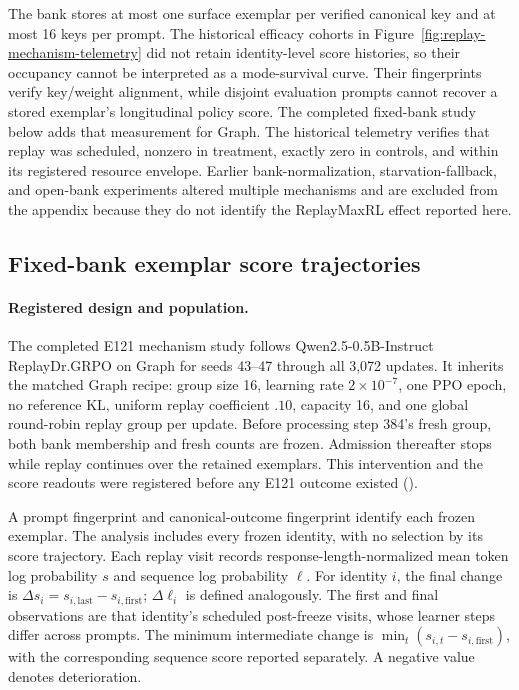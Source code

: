 \documentclass{article}
\newcommand{\1}{\mathbf 1}
\theoremstyle{remark}
\theoremstyle{definition}
\theoremstyle{plain}
\begin{document}
The bank stores at most one surface exemplar per verified canonical key and at
most 16 keys per prompt. The historical efficacy cohorts in
Figure~\ref{fig:replay-mechanism-telemetry} did not retain identity-level score
histories, so their occupancy cannot be interpreted as a mode-survival curve.
Their fingerprints verify key/weight alignment, while disjoint evaluation
prompts cannot recover a stored exemplar's longitudinal policy score.
The completed fixed-bank study below adds that measurement for Graph.
The historical telemetry verifies that replay was scheduled, nonzero in
treatment, exactly zero in controls, and within its registered resource envelope. Earlier
bank-normalization, starvation-fallback, and open-bank experiments altered
multiple mechanisms and are excluded from the appendix because they do not
identify the ReplayMaxRL effect reported here.

\subsection{Fixed-bank exemplar score trajectories}
\label{app:fixed-bank-survival}

\paragraph{Registered design and population.}
The completed E121 mechanism study follows Qwen2.5-0.5B-Instruct
ReplayDr.GRPO on Graph for seeds 43--47 through all 3,072 updates. It inherits
the matched Graph recipe: group size 16, learning rate $2\times10^{-7}$,
one PPO epoch, no reference KL, uniform replay coefficient $.10$, capacity
16, and one global round-robin replay group per update. Before processing
step 384's fresh group, both bank membership and fresh counts are frozen.
Admission thereafter stops while replay continues over the retained exemplars.
This intervention and the score readouts were registered before any E121
outcome existed
().

A prompt fingerprint and canonical-outcome fingerprint identify each frozen
exemplar. The analysis includes every frozen identity, with no selection by its
score trajectory. Each replay visit records response-length-normalized mean
token log probability $s$ and sequence log probability $\ell$. For identity
$i$, the final change is $\Delta s_i=s_{i,\mathrm{last}}-s_{i,\mathrm{first}}$;
$\Delta\ell_i$ is defined analogously. The first and final observations are
that identity's scheduled post-freeze visits, whose learner steps differ across
prompts. The minimum intermediate change is
$\min_t(s_{i,t}-s_{i,\mathrm{first}})$, with the corresponding sequence score
reported separately. A negative value denotes deterioration.
\end{document}
